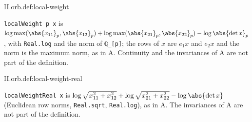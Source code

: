 \begin{definition}
\end{definition}
\begin{tfformal}{II.orb.def:local-weight}
\begin{tffidelity}
\texttt{localWeight p x} is $\log\max(\abs{x_{11}}_p,\abs{x_{12}}_p)+\log\max(\abs{x_{21}}_p,\abs{x_{22}}_p)-\log\abs{\det x}_p$, with \texttt{Real.log} and the norm of \texttt{ℚ\_[p]}; the rows of $x$ are $e_1x$ and $e_2x$ and the norm is the maximum norm, as in A. Continuity and the invariances of A are not part of the definition.
\end{tffidelity}
\end{tfformal}

\begin{definition}
\end{definition}
\begin{tfformal}{II.orb.def:local-weight-real}
\begin{tffidelity}
\texttt{localWeightReal x} is $\log\sqrt{x_{11}^2+x_{12}^2}+\log\sqrt{x_{21}^2+x_{22}^2}-\log\abs{\det x}$ (Euclidean row norms, \texttt{Real.sqrt}, \texttt{Real.log}), as in A. The invariances of A are not part of the definition.
\end{tffidelity}
\end{tfformal}

